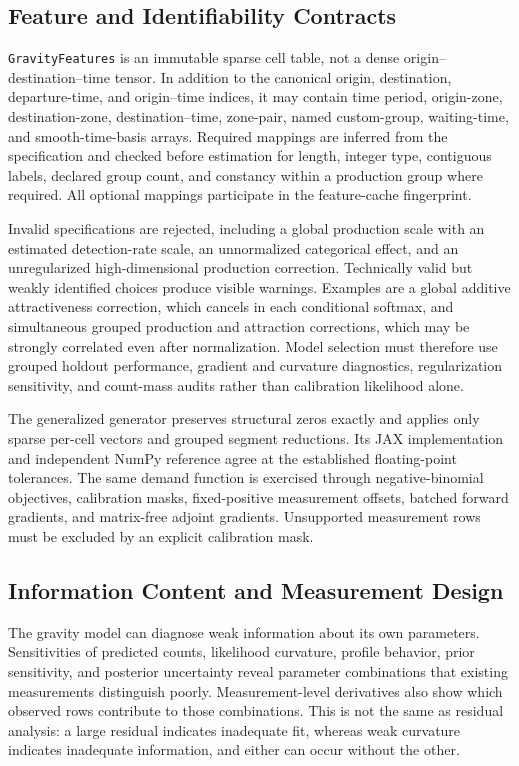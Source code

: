 \subsection{Feature and Identifiability Contracts}

\texttt{GravityFeatures} is an immutable sparse cell table, not a dense
origin--destination--time tensor. In addition to the canonical origin,
destination, departure-time, and origin--time indices, it may contain time
period, origin-zone, destination-zone, destination--time, zone-pair, named
custom-group, waiting-time, and smooth-time-basis arrays. Required mappings
are inferred from the specification and checked before estimation for length,
integer type, contiguous labels, declared group count, and constancy within a
production group where required. All optional mappings participate in the
feature-cache fingerprint.

Invalid specifications are rejected, including a global production scale with
an estimated detection-rate scale, an unnormalized categorical effect, and an
unregularized high-dimensional production correction. Technically valid but
weakly identified choices produce visible warnings. Examples are a global
additive attractiveness correction, which cancels in each conditional softmax,
and simultaneous grouped production and attraction corrections, which may be
strongly correlated even after normalization. Model selection must therefore
use grouped holdout performance, gradient and curvature diagnostics,
regularization sensitivity, and count-mass audits rather than calibration
likelihood alone.

The generalized generator preserves structural zeros exactly and applies only
sparse per-cell vectors and grouped segment reductions. Its JAX implementation
and independent NumPy reference agree at the established floating-point
tolerances. The same demand function is exercised through negative-binomial
objectives, calibration masks, fixed-positive measurement offsets, batched
forward gradients, and matrix-free adjoint gradients. Unsupported measurement
rows must be excluded by an explicit calibration mask.

\subsection{Information Content and Measurement Design}

The gravity model can diagnose weak information about its own parameters.
Sensitivities of predicted counts, likelihood curvature, profile behavior,
prior sensitivity, and posterior uncertainty reveal parameter combinations
that existing measurements distinguish poorly. Measurement-level derivatives
also show which observed rows contribute to those combinations. This is not
the same as residual analysis: a large residual indicates inadequate fit,
whereas weak curvature indicates inadequate information, and either can occur
without the other.

